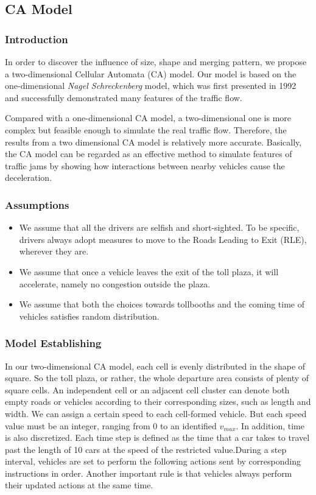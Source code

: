 \documentclass{mcmthesis}
\begin{document}
\subsection{CA Model}
\subsubsection{Introduction}
In order to discover the influence of size, shape and merging pattern, we
 propose a two-dimensional Cellular Automata (CA) model. Our model is based on
 the one-dimensional \emph{Nagel Schreckenberg} model, which was first presented in
 1992 and successfully demonstrated many features of the traffic flow.

 Compared with a one-dimensional CA model, a two-dimensional one is more complex
 but feasible enough to simulate the real traffic flow. Therefore, the results
 from a two dimensional CA model is relatively more accurate.  Basically,
 the CA model can be regarded as an effective method to simulate features of
 traffic jams by showing how interactions between nearby vehicles cause the
 deceleration.
\subsubsection{Assumptions}
\begin{itemize}
\item We assume that all the drivers are selfish
and short-sighted. To be specific, drivers always
adopt measures to move to the Roads Leading to Exit
(RLE), wherever they are.
\item We assume that once a vehicle leaves the
exit of the toll plaza, it will accelerate, namely
no congestion outside the plaza.
\item We assume that both the choices
towards tollbooths and the coming time of
vehicles satisfies random distribution.
\end{itemize}
\subsubsection{Model Establishing}
 In our two-dimensional CA model, each cell is
 evenly distributed in the shape of square. So the
 toll plaza, or rather, the whole departure area
 consists of plenty of square cells.
An independent cell or an adjacent cell cluster
can denote both empty roads or vehicles according
to their corresponding sizes, such as length and width.
We can assign a certain speed to each cell-formed vehicle.
But each speed value must be an integer, ranging from 0
to an identified $v_{max}$.
In addition, time is also discretized. Each time step
is defined as the time that a car takes to travel past
the length of 10 cars at the speed of the restricted
value.During a step interval, vehicles are set to perform
the following actions sent by corresponding instructions
in order.
Another important rule is that vehicles always perform
their updated actions at the same time.
\end{document}
